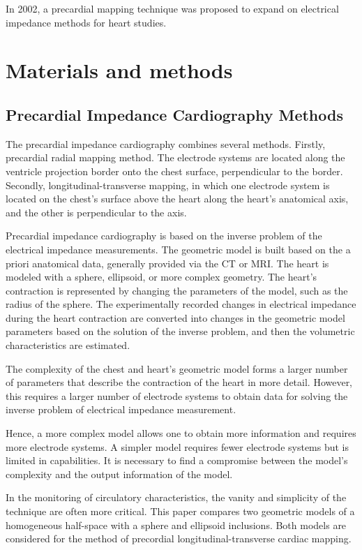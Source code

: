 \documentclass[conference]{IEEEtran}
\begin{document}
In 2002, a precardial mapping technique was proposed to expand on electrical
impedance methods for heart studies.

\section{Materials and methods}

\subsection{Precardial Impedance Cardiography Methods}

The precardial impedance cardiography combines several methods. Firstly,
precardial radial mapping method. The electrode systems are located along the
ventricle projection border onto the chest surface, perpendicular to the border.
Secondly, longitudinal-transverse mapping, in which one electrode system is
located on the chest's surface above the heart along the heart's anatomical
axis, and the other is perpendicular to the axis. 

Precardial impedance cardiography is based on the inverse problem of the
electrical impedance measurements. The geometric model is built based on the a
priori anatomical data, generally provided via the CT or MRI. 
The heart is modeled with a sphere, ellipsoid, or more complex geometry. The
heart's contraction is represented by changing the parameters of the model, such
as the radius of the sphere. The experimentally recorded changes in electrical
impedance during the heart contraction are converted into changes in the
geometric model parameters based on the solution of the inverse problem, and
then the volumetric characteristics are estimated. 

The complexity of the chest and heart's geometric model forms a larger number of
parameters that describe the contraction of the heart in more detail. However,
this requires a larger number of electrode systems to obtain data for solving
the inverse problem of electrical impedance measurement. 

Hence, a more complex model allows one to obtain more information and requires
more electrode systems. A simpler model requires fewer electrode systems but is
limited in capabilities. It is necessary to find a compromise between the
model's complexity and the output information of the model. 

In the monitoring of circulatory characteristics, the vanity and simplicity of
the technique are often more critical. This paper compares two geometric models
of a homogeneous half-space with a sphere and ellipsoid inclusions. Both models
are considered for the method of precordial longitudinal-transverse cardiac
mapping. 
\end{document}
